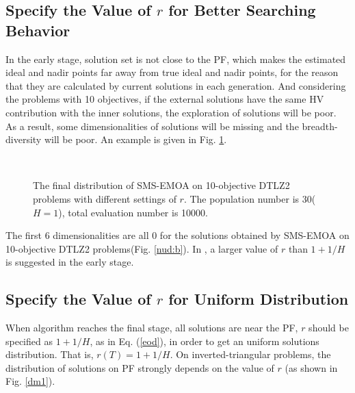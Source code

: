\documentclass[conference]{IEEEtran}
\begin{document}
\subsection{Specify the Value of $r$ for Better Searching Behavior}
In the early stage, solution set is not close to the PF, which makes the 
estimated ideal and nadir points far away from true ideal and nadir points, for the reason that
they are calculated by current solutions in each generation. 
And considering the problems with 10 objectives, 
if the external solutions have the same HV contribution with the inner solutions, 
the exploration of solutions will be poor. 
As a result, some dimensionalities of solutions will be missing and the breadth-diversity\cite{DtA} will be poor. 
An example is given in Fig. \ref{nud}. 
\begin{figure}[!t]
  \centering
  \quad
  \\
  \caption{
    The final distribution of SMS-EMOA on 10-objective DTLZ2 problems with different settings of $r$. 
    The population number is 30($H=1$), total evaluation number is 10000.
  }
  \label{nud}
\end{figure} 
The first 6 dimensionalities are all 0 for the solutions obtained by SMS-EMOA on 10-objective DTLZ2 problems(Fig. \ref{nud:b}). 
In \cite{hisao:dynamic}, a larger value of $r$ than $1+1/H$ is suggested in the early stage. 

\subsection{Specify the Value of $r$ for Uniform Distribution}
When algorithm reaches the final stage, all solutions are near the PF, $r$ should
be specified as $1+1/H$, as in Eq. (\ref{eod}), 
in order to get an uniform solutions distribution. 
That is, $r(T)=1+1/H$. 
On inverted-triangular problems, the distribution of solutions on PF
strongly depends on the value of $r$ (as shown in Fig. \ref{dm1}). 
\end{document}
